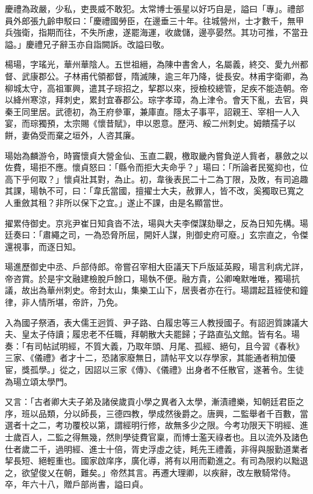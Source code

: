 \begin{pinyinscope}
 慶禮為政嚴，少私，吏畏威不敢犯。太常博士張星以好巧自是，謚曰「專」。禮部員外郎張九齡申駁曰：「慶禮國勞臣，在邊垂三十年。往城營州，士才數千，無甲兵強衛，指期而往，不失所慮，遂罷海運，收歲儲，邊亭晏然。其功可推，不當丑謚。」慶禮兄子辭玉亦自詣闕訴。改謚曰敬。



 楊瑒，字瑤光，華州華陰人。五世祖縉，為陳中書舍人，名屬義，終交、愛九州都督、武康郡公。子林甫代領都督，隋滅陳，逾三年乃降，徙長安。林甫字衛卿，為柳城太守，高祖軍興，遣其子琮招之，挈郡以來，授檢校總管，足疾不能造朝。帝以絳州寒涼，拜刺史，累封宜春郡公。琮字孝璋，為上津令。會天下亂，去官，與秦王同里居。武德初，為王府參軍，兼庫直。隱太子事平，詔親王、宰相一人入宴，而琮獨預，太宗賜《懷昔賦》，申以恩意。歷沔、綏二州刺史。姆饋孺子以餅，妻偽受而棄之垣外，人咨其廉。



 瑒始為麟游令，時竇懷貞大營金仙、玉直二觀，檄取畿內嘗負逆人貲者，暴斂之以佐費，瑒拒不應。懷貞怒曰：「縣令而拒大夫命乎？」瑒曰：「所論者民冤抑也，位高下乎何取？」懷貞壯其對，為止。初，韋後表民二十二為丁限，及敗，有司追趣其課，瑒執不可，曰：「韋氏當國，擅擢士大夫，赦罪人，皆不改，奚獨取已寬之人重斂其租？非所以保下之宜。」遂止不課，由是名顯當世。



 擢累侍御史。京兆尹崔日知貪沓不法，瑒與大夫李傑謀劾舉之，反為日知先構。瑒廷奏曰：「肅繩之司，一為恐脅所屈，開奸人謀，則御史府可廢。」玄宗直之，令傑還視事，而逐日知。



 瑒進歷御史中丞、戶部侍郎。帝嘗召宰相大臣議天下戶版延英殿，瑒言利病尤詳，帝咨賞。於是宇文融建檢脫戶餘口，瑒執不便。融方貴，公卿唵默唯唯，獨瑒抗議，故出為華州刺史。帝封太山，集樂工山下，居喪者亦在行。瑒謂起苴絰使和鐘律，非人情所堪，帝許，乃免。



 入為國子祭酒，表大儒王迥質、尹子路、白履忠等三人教授國子。有詔迥質諫議大夫、皇太子侍讀；履忠老不任職，拜朝散大夫罷歸；子路直弘文館。皆有名。瑒奏：「有司帖試明經，不質大義，乃取年頭、月尾、孤經、絕句，且今習《春秋》三家、《儀禮》者才十二，恐諸家廢無日，請帖平文以存學家，其能通者稍加優宦，獎孤學。」從之，因詔以三家《傳》、《儀禮》出身者不任散官，遂著令。生徒為瑒立頌太學門。



 又言：「古者卿大夫子弟及諸侯歲貢小學之異者入太學，漸漬禮樂，知朝廷君臣之序，班以品類，分以師長，三德四教，學成然後爵之。唐興，二監舉者千百數，當選者十之二，考功覆校以第，謂經明行修，故無多少之限。今考功限天下明經、進士歲百人，二監之得無幾，然則學徒費官稟，而博士濫天祿者也。且以流外及諸色仕者歲二千，過明經、進士十倍，胥史浮虛之徒，眊先王禮義，非得與服勤道業者挈長短、絕輕重也。國家啟庠序，廣化導，將有以用而勸進之。有司為限約以黜退之，欲望俊乂在朝，難矣。」帝然其言。再遷大理卿，以疾辭，改左散騎常侍。卒，年六十八，贈戶部尚書，謚曰貞。




\end{pinyinscope}
